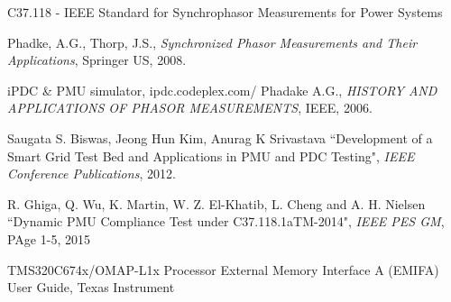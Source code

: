 \begin{thebibliography}{25}
 C37.118 - IEEE Standard for Synchrophasor Measurements for Power Systems

Phadke, A.G., Thorp, J.S.,  \textit{Synchronized Phasor Measurements and Their Applications}, Springer US, 2008.

iPDC \& PMU simulator, ipdc.codeplex.com/ 
Phadake A.G., \textit{HISTORY AND APPLICATIONS OF PHASOR MEASUREMENTS}, IEEE, 2006.

Saugata S. Biswas, Jeong Hun Kim, Anurag K Srivastava ``Development of a Smart Grid Test Bed and Applications in PMU and PDC Testing", \textit{IEEE Conference Publications}, 2012.

R. Ghiga, Q. Wu, K. Martin, W. Z. El-Khatib, L. Cheng and A. H. Nielsen ``Dynamic PMU Compliance Test under C37.118.1aTM-2014", \textit{IEEE PES GM}, PAge 1-5, 2015

TMS320C674x/OMAP-L1x Processor External Memory Interface A (EMIFA) User Guide, Texas Instrument
\end{thebibliography}